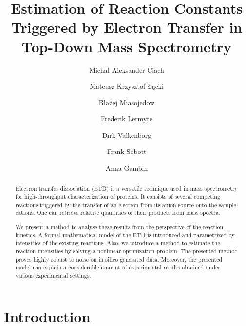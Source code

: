 \documentclass{llncs}
\begin{document}
\pagestyle{plain}
\title{Estimation of Reaction Constants Triggered by Electron Transfer in Top-Down Mass Spectrometry}
\author{Michał Aleksander Ciach \and Mateusz Krzysztof Łącki \and Błażej Miasojedow \and Frederik Lermyte \and Dirk Valkenborg \and Frank Sobott \and Anna Gambin }



\maketitle
\begin{abstract}
Electron transfer dissociation (ETD) is a versatile technique used in mass spectrometry for high-throughput characterization of proteins. It consists of several competing reactions triggered by the transfer of an electron from its anion source onto the sample cations. One can retrieve relative quantities of their products from mass spectra.

We present a method to analyse these results from the perspective of the reaction kinetics. A formal mathematical model of the ETD is introduced and parametrized by intensities of the existing reactions. Also, we introduce a method to estimate the reaction intensities by solving a nonlinear optimization problem. The presented method proves highly robust to noise on in silico generated data. Moreover, the presented model can explain a considerable amount of experimental results obtained under various experimental settings.
\end{abstract}

\section{Introduction}
\end{document}
